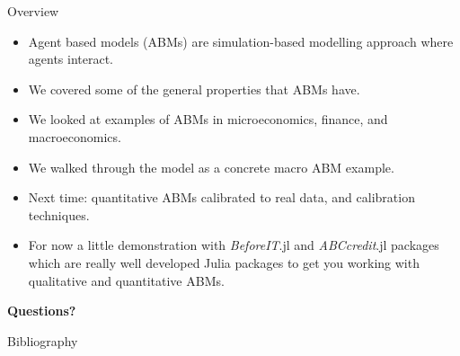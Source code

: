 \documentclass[9pt]{beamer}
\begin{document}
\begin{frame}{Overview}
    \begin{itemize}
        \item<1-> Agent based models (ABMs) are simulation-based modelling approach where agents interact.
        \item<2-> We covered some of the general properties that ABMs have.
        \item<3-> We looked at examples of ABMs in microeconomics, finance, and macroeconomics.
        \item<4-> We walked through the \cite{assenza_emergent_2015} model as a concrete macro ABM example.
        \item<5-> Next time: quantitative ABMs calibrated to real data, and calibration techniques.
        \item<6-> For now a little demonstration with \textit{BeforeIT}.jl and \textit{ABCcredit}.jl packages which are really well developed Julia packages to get you working with qualitative and quantitative ABMs.
    \end{itemize}
\end{frame}
\begin{frame}
    \Huge \centering \textbf{Questions?}
\end{frame}
\begin{frame}[allowframebreaks]{Bibliography}
    
\end{frame}
\end{document}
